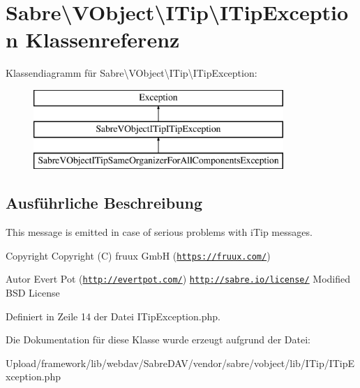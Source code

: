 \hypertarget{class_sabre_1_1_v_object_1_1_i_tip_1_1_i_tip_exception}{}\section{Sabre\textbackslash{}V\+Object\textbackslash{}I\+Tip\textbackslash{}I\+Tip\+Exception Klassenreferenz}
\label{class_sabre_1_1_v_object_1_1_i_tip_1_1_i_tip_exception}
Klassendiagramm für Sabre\textbackslash{}V\+Object\textbackslash{}I\+Tip\textbackslash{}I\+Tip\+Exception\+:\begin{figure}[H]
\begin{center}
\leavevmode
\includegraphics[height=3.000000cm]{class_sabre_1_1_v_object_1_1_i_tip_1_1_i_tip_exception}
\end{center}
\end{figure}


\subsection{Ausführliche Beschreibung}
This message is emitted in case of serious problems with i\+Tip messages.

\begin{DoxyCopyright}{Copyright}
Copyright (C) fruux GmbH (\href{https://fruux.com/}{\tt https\+://fruux.\+com/}) 
\end{DoxyCopyright}
\begin{DoxyAuthor}{Autor}
Evert Pot (\href{http://evertpot.com/}{\tt http\+://evertpot.\+com/})  \href{http://sabre.io/license/}{\tt http\+://sabre.\+io/license/} Modified B\+SD License 
\end{DoxyAuthor}


Definiert in Zeile 14 der Datei I\+Tip\+Exception.\+php.



Die Dokumentation für diese Klasse wurde erzeugt aufgrund der Datei\+:\begin{DoxyCompactItemize}
\item 
Upload/framework/lib/webdav/\+Sabre\+D\+A\+V/vendor/sabre/vobject/lib/\+I\+Tip/I\+Tip\+Exception.\+php\end{DoxyCompactItemize}
